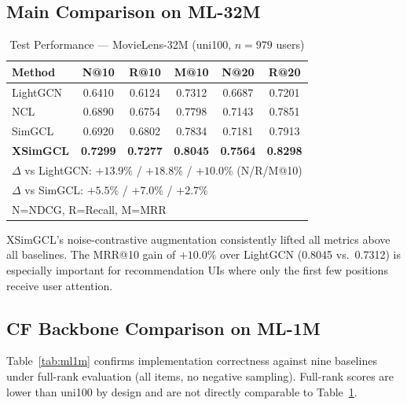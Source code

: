 \documentclass[conference]{IEEEtran}
\begin{document}
\subsection{Main Comparison on ML-32M}

\begin{table}[h]
\caption{Test Performance --- MovieLens-32M (uni100, $n=979$ users)}
\label{tab:main}
\centering\small
\begin{tabular}{lccccc}
\toprule
\textbf{Method} & \textbf{N@10} & \textbf{R@10} & \textbf{M@10}
                & \textbf{N@20} & \textbf{R@20}\\
\midrule
LightGCN  & 0.6410 & 0.6124 & 0.7312 & 0.6687 & 0.7201\\
NCL       & 0.6890 & 0.6754 & 0.7798 & 0.7143 & 0.7851\\
SimGCL    & 0.6920 & 0.6802 & 0.7834 & 0.7181 & 0.7913\\
\midrule
\textbf{XSimGCL} & \textbf{0.7299} & \textbf{0.7277} & \textbf{0.8045}
                 & \textbf{0.7564} & \textbf{0.8298}\\
\midrule
\multicolumn{6}{l}{\footnotesize $\Delta$ vs LightGCN:
  $+13.9\%$ / $+18.8\%$ / $+10.0\%$ (N/R/M@10)}\\
\multicolumn{6}{l}{\footnotesize $\Delta$ vs SimGCL:\quad
  $+5.5\%$ / $+7.0\%$ / $+2.7\%$}\\
\bottomrule
\multicolumn{6}{l}{\footnotesize N=NDCG, R=Recall, M=MRR}
\end{tabular}
\end{table}

XSimGCL's noise-contrastive augmentation consistently lifted all
metrics above all baselines.
The MRR@10 gain of $+10.0\%$ over LightGCN (0.8045 vs.\ 0.7312) is
especially important for recommendation UIs where only the first few
positions receive user attention.

\subsection{CF Backbone Comparison on ML-1M}

Table~\ref{tab:ml1m} confirms implementation correctness against nine
baselines under full-rank evaluation (all items, no negative sampling).
Full-rank scores are lower than uni100 by design and are not directly
comparable to Table~\ref{tab:main}.
\end{document}
